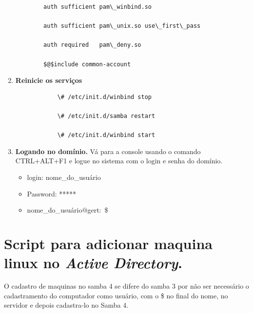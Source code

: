 \begin{enumerate}

		\begin{lstlisting}
		auth sufficient pam\_winbind.so

		auth sufficient pam\_unix.so use\_first\_pass

		auth required   pam\_deny.so

		$@$include common-account
		\end{lstlisting}

	\item \textbf{Reinicie os serviços}
		\begin{lstlisting}
			\# /etc/init.d/winbind stop

			\# /etc/init.d/samba restart
			
			\# /etc/init.d/winbind start
		\end{lstlisting}

	\item \textbf{Logando no domínio.}
		Vá para a console usando o comando CTRL+ALT+F1 e logue no sistema com o login e senha do domínio.

		\begin{itemize}
			\item {login: nome\_do\_usuário}
			\item {Password: *****}
			\item {nome\_do\_usuário$@$gert:~\$}
		\end{itemize}

\end{enumerate}

\section{Script para adicionar maquina linux no \textit{Active Directory}.}

O cadastro de maquinas no samba 4 se difere do samba 3 por não ser necessário o cadastramento do computador como usuário, com o \$ no final do nome, no servidor e depois cadastra-lo no Samba 4.

